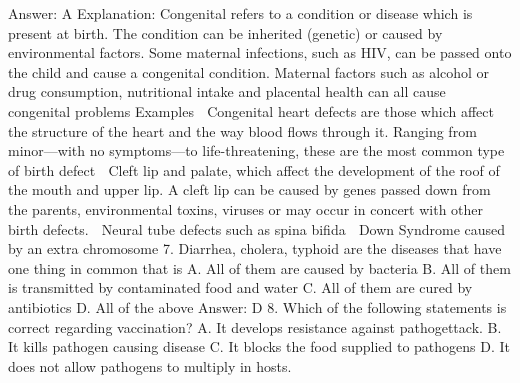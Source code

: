 Answer: A
Explanation: Congenital refers to a condition or disease which is present at birth. The condition can be inherited (genetic) or caused by environmental factors. Some maternal infections, such as HIV, can be passed onto the child and cause a congenital condition. Maternal factors such as alcohol or drug consumption, nutritional intake and placental health can all cause congenital problems Examples  Congenital heart defects are those which affect the structure of the heart and the way blood flows through it. Ranging from minor—with no symptoms—to life-threatening, these are the most common type of birth defect  Cleft lip and palate, which affect the development of the roof of the mouth and upper lip. A cleft lip can be caused by genes passed down from the parents, environmental toxins, viruses or may occur in concert with other birth defects.  Neural tube defects such as spina bifida  Down Syndrome caused by an extra chromosome 7. Diarrhea, cholera, typhoid are the diseases that have one thing in common that is A. All of them are caused by bacteria B. All of them is transmitted by contaminated food and water C. All of them are cured by antibiotics D. All of the above 
Answer: D 8. Which of the following statements is correct regarding vaccination? A. It develops resistance 
against pathogettack. B. It kills pathogen causing disease C. It blocks the food supplied to pathogens D. It does not allow pathogens to multiply in hosts. 

